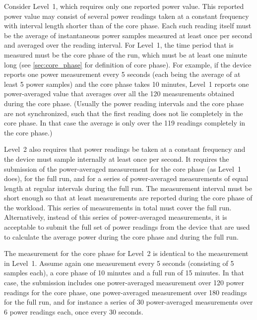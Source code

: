 Consider Level~1, which requires only one reported power value.
This reported power value may consist of several power readings taken at a constant frequency with interval length shorter than \MaxReadingIntervalCorePhaseLTwoThree{} of the core phase.
Each such reading itself must be the average of instantaneous power samples measured at least once per second and averaged over the reading interval.
For Level~1, the time period that is measured must be the core phase of the run, which must be at least one minute long (see \ref{sec:core_phase} for definition of core phase).
For example, if the device reports one power measurement every \num{5} seconds (each being the average of at least \num{5} power samples) and the core phase takes \num{10} minutes, Level~1 reports one power-averaged value that averages over all the \num{120} measurements obtained during the core phase.
(Usually the power reading intervals and the core phase are not synchronized, such that the first reading does not lie completely in the core phase.
In that case the average is only over the \num{119} readings completely in the core phase.)

Level~2 also requires that power readings be taken at a constant frequency and the device must sample internally at least once per second.
It requires the submission of the power-averaged measurement for the core phase (as Level~1 does), for the full run, and for a series of power-averaged measurements of equal length at regular intervals during the full run.
The measurement interval must be short enough so that at least \MinMeasurementsCorePhaseLTwoThree{} measurements are reported during the core phase of the workload.
This series of measurements in total must cover the full run.
Alternatively, instead of this series of power-averaged measurements, it is acceptable to submit the full set of power readings from the device that are used to calculate the average power during the core phase and during the full run.

The measurement for the core phase for Level~2 is identical to the measurement in Level~1.
Assume again one measurement every \num{5} seconds (consisting of \num{5} samples each), a core phase of \num{10} minutes and a full run of \num{15} minutes.
In that case, the submission includes one power-averaged measurement over \num{120} power readings for the core phase, one power-averaged measurement over \num{180} readings for the full run, and for instance a series of \num{30} power-averaged measurements over \num{6} power readings each, once every \num{30} seconds.


